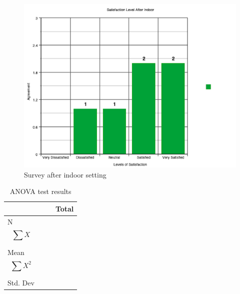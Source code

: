 \documentclass{sigchi}
\begin{document}
\begin{figure}
    \centering
    \includegraphics[scale=0.4]{figures/Indoor_setting.png}
    \caption{Survey after indoor setting}
    \label{fig:my_label10}
\end{figure}

\setlength{\arrayrulewidth}{1mm}
\setlength{\tabcolsep}{8pt}
\renewcommand{\arraystretch}{1.25}
{
\begin{table}
\begin{tabularx}{0.45\textwidth}{ 
  | >{\centering\arraybackslash}X 
  | >{\centering\arraybackslash}X 
  | >{\centering\arraybackslash}X
  | >{\centering\arraybackslash}X |}
\hline
 & 1 & 2 & Total \\
\hline
N & 5 & 5 & 10 \\
\hline
$$\sum_{}^{} X$$ & 6 & 6 & 12 \\
\hline
Mean & 1.2 & 1.2 & 1.2 \\
\hline
$$\sum_{}^{} X^2$$ & 10 & 10 & 20 \\
\hline
Std. Dev & 0.8367 & 0.8367 & 0.7888 \\
\hline
\end{tabularx}
\caption{ANOVA test results }
\label{tab:my_label12}
\end{table}
}
\end{document}
